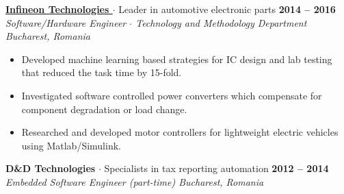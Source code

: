\documentclass[11pt]{res}
\begin{document}
\begin{resume}
\begin{rightrule}
\begin{itemize}[parsep=0pt]
\end{itemize}
\end{rightrule}
\vspace{-6mm}
\textbf{\Large \href{http://www.infineon.com/}{Infineon Technologies \scriptsize {}}} \enskip $\cdot$ \enskip Leader in automotive electronic parts  
\hfill        \textbf{2014 -- 2016}\enskip \enskip \enskip\\
\textit{Software/Hardware Engineer \enskip $\cdot$ \enskip  Technology and Methodology Department \hfill  Bucharest, Romania }

\begin{rightrule}
    \begin{itemize}[noitemsep]
    \item Developed machine learning based strategies for IC design and lab testing that reduced the task time by 15-fold.
    \item Investigated software controlled power converters which compensate for component degradation or load change.
    \item Researched and developed motor controllers for lightweight electric vehicles using Matlab/Simulink.
    \end{itemize}
\end{rightrule}
\vspace{-6mm}
\textbf{\Large D\&D Technologies} \enskip $\cdot$ \enskip Specialists in tax reporting automation
\hfill                   \textbf{2012 -- 2014}\enskip \enskip \enskip\\
\textit{Embedded Software Engineer (part-time) \hfill Bucharest, Romania }


\end{resume}
\end{document}
